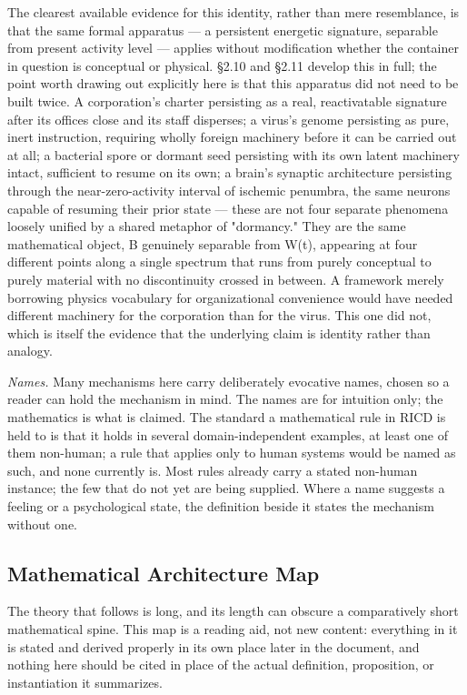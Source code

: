 \documentclass[
]{article}
\begin{document}
The clearest available evidence for this identity, rather than mere
resemblance, is that the same formal apparatus --- a persistent
energetic signature, separable from present activity level --- applies
without modification whether the container in question is conceptual or
physical. §2.10 and §2.11 develop this in full; the point worth drawing
out explicitly here is that this apparatus did not need to be built
twice. A corporation's charter persisting as a real, reactivatable
signature after its offices close and its staff disperses; a virus's
genome persisting as pure, inert instruction, requiring wholly foreign
machinery before it can be carried out at all; a bacterial spore or
dormant seed persisting with its own latent machinery intact, sufficient
to resume on its own; a brain's synaptic architecture persisting through
the near-zero-activity interval of ischemic penumbra, the same neurons
capable of resuming their prior state --- these are not four separate
phenomena loosely unified by a shared metaphor of "dormancy." They are
the same mathematical object, B genuinely separable from W(t), appearing
at four different points along a single spectrum that runs from purely
conceptual to purely material with no discontinuity crossed in between.
A framework merely borrowing physics vocabulary for organizational
convenience would have needed different machinery for the corporation
than for the virus. This one did not, which is itself the evidence that
the underlying claim is identity rather than analogy.

\emph{Names.} Many mechanisms here carry deliberately evocative names,
chosen so a reader can hold the mechanism in mind. The names are for
intuition only; the mathematics is what is claimed. The standard a
mathematical rule in RICD is held to is that it holds in several
domain-independent examples, at least one of them non-human; a rule that
applies only to human systems would be named as such, and none currently
is. Most rules already carry a stated non-human instance; the few that
do not yet are being supplied. Where a name suggests a feeling or a
psychological state, the definition beside it states the mechanism
without one.

\hypertarget{mathematical-architecture-map}{%
\subsection{Mathematical Architecture
Map}\label{mathematical-architecture-map}}

The theory that follows is long, and its length can obscure a
comparatively short mathematical spine. This map is a reading aid, not
new content: everything in it is stated and derived properly in its own
place later in the document, and nothing here should be cited in place
of the actual definition, proposition, or instantiation it summarizes.
\end{document}
